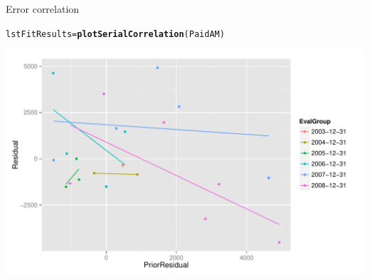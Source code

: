 \documentclass[xcolor=dvipsnames]{beamer}\usepackage{graphicx, color}
\makeatletter
\def\maxwidth{ %
  \ifdim\Gin@nat@width>\linewidth
    \linewidth
  \else
    \Gin@nat@width
  \fi
}
\newcommand{\hlfunctioncall}[1]{\textcolor[rgb]{0.501960784313725,0,0.329411764705882}{\textbf{#1}}}%
\newenvironment{kframe}{%
 \def\at@end@of@kframe{}%
 \ifinner\ifhmode%
  \def\at@end@of@kframe{\end{minipage}}%
  \begin{minipage}{\columnwidth}%
 \fi\fi%
 \def\FrameCommand##1{\hskip\@totalleftmargin \hskip-\fboxsep
 \colorbox{shadecolor}{##1}\hskip-\fboxsep
     \hskip-\linewidth \hskip-\@totalleftmargin \hskip\columnwidth}%
 \MakeFramed {\advance\hsize-\width
   \@totalleftmargin\z@ \linewidth\hsize
   \@setminipage}}%
 {\par\unskip\endMakeFramed%
 \at@end@of@kframe}
\newenvironment{knitrout}{}{} %
\makeatother
\begin{document}
\begin{frame}[fragile]{Error correlation}
\begin{knitrout}
\color{fgcolor}\begin{kframe}
\begin{alltt}
lstFitResults = \hlfunctioncall{plotSerialCorrelation}(PaidAM)
\end{alltt}
\end{kframe}
\includegraphics[width=\maxwidth]{figure/SerialCorrelationPlot} 

\end{knitrout}

\end{frame}
\end{document}
